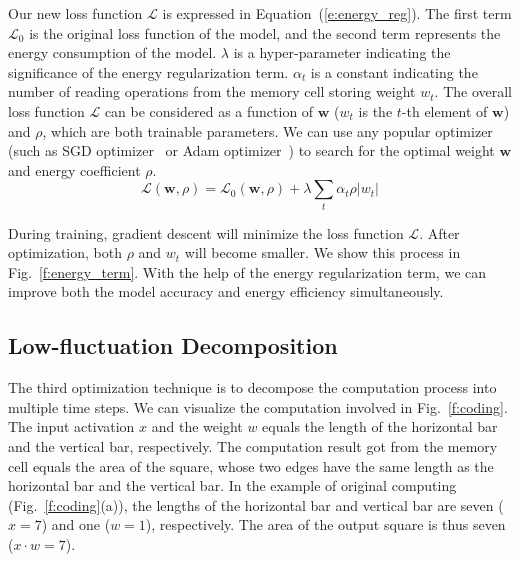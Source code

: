 \documentclass[10pt,journal,compsoc]{IEEEtran}
\begin{document}
Our new loss function $\mathcal{L}$ is expressed in Equation~(\ref{e:energy_reg}). The first term $\mathcal{L}_0$ is the original loss function of the model, and the second term represents the energy consumption of the model. $\lambda$ is a hyper-parameter indicating the significance of the energy regularization term. $\alpha_t$ is a constant indicating the number of reading operations from the memory cell 
storing weight $w_t$. The overall loss function $\mathcal{L}$ can be considered as a function of $\textbf{w}$ ($w_t$ is the $t$-th element of $\textbf{w}$) and $\rho$, which are both trainable parameters. We can use any popular optimizer (such as SGD optimizer~\cite{bottou2012stochastic} or Adam optimizer~\cite{zhang2018improved}) to search for the optimal weight $\mathbf{w}$ and energy coefficient $\rho$.
\begin{equation}
\mathcal{L}(\textbf{w},\rho)= \mathcal{L}_0(\textbf{w}, \rho) + \lambda \sum_{t}{\alpha_t \rho |w_t|}
\label{e:energy_reg}
\end{equation}

During training, gradient descent will minimize the loss function $\mathcal{L}$. After optimization, both $\rho$ and $w_t$ will become smaller. We show this process in Fig.~\ref{f:energy_term}. With the help of the energy regularization term, we can improve both the model accuracy and energy efficiency simultaneously.

\subsection{Low-fluctuation Decomposition}

The third optimization technique is to decompose the computation process into multiple time steps. We can visualize the computation involved in Fig.~\ref{f:coding}. The input activation $x$ and the weight $w$ equals the length of the horizontal bar and the vertical bar, respectively. The computation result got from the memory cell equals the area of the square, whose two edges have the same length as the horizontal bar and the vertical bar. In the example of original computing (Fig.~\ref{f:coding}(a)), the lengths of the horizontal bar and vertical bar are 
seven ($x=7$) and one ($w=1$), respectively. The area of the output square is thus seven ($x\cdot w=7$).
\end{document}

